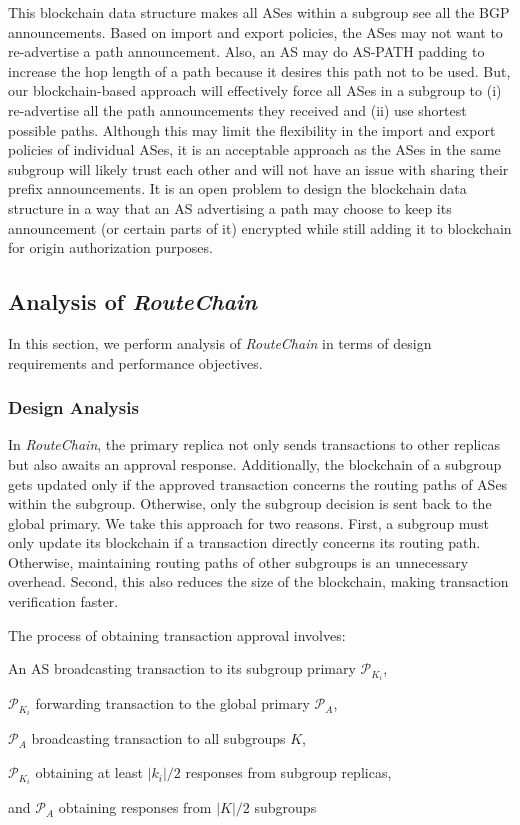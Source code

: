 \documentclass[5p]{elsarticle}
\newcommand{\rc}{{{\em RouteChain}}\xspace}
\begin{document}
This blockchain data structure makes all ASes within a subgroup see all the BGP announcements. Based on import and export policies, the ASes may not want to re-advertise a path announcement. Also, an AS may do AS-PATH padding to increase the hop length of a path because it desires this path not to be used. But, our blockchain-based approach will effectively force all ASes in a subgroup to (i) re-advertise all the path announcements they received and (ii) use shortest possible paths. Although this may limit the flexibility in the import and export policies of individual ASes, it is an acceptable approach as the ASes in the same subgroup will likely trust each other and will not have an issue with sharing their prefix announcements. It is an open problem to design the blockchain data structure in a way that an AS advertising a path may choose to keep its announcement (or certain parts of it) encrypted while still adding it to blockchain for origin authorization purposes.






\subsection{Analysis of {\em RouteChain}} \label{sec:ana}
In this section, we perform analysis of \rc in terms of design requirements and performance objectives. 
\subsubsection{Design Analysis}\label{sec:da}
In \rc, the primary replica not only sends transactions to other replicas but also awaits an approval response. Additionally, the blockchain of a subgroup gets updated only if the approved transaction concerns the routing paths of ASes within the subgroup. Otherwise, only the subgroup decision is sent back to the global primary. We take this approach for two reasons. First, a subgroup must only update its blockchain if a transaction directly concerns its routing path. Otherwise,  maintaining routing paths of other subgroups is an unnecessary overhead. Second, this also reduces the size of the blockchain, making transaction verification faster. 

The process of obtaining transaction approval involves:
\begin{enumerate*}
    \item An AS broadcasting transaction to its subgroup primary $\mathcal{P}_{K_{i}}$,
    \item $\mathcal{P}_{K_{i}}$ forwarding transaction to the global primary $\mathcal{P}_{A}$,
    \item $\mathcal{P}_{A}$ broadcasting transaction to all subgroups $K$, 
    \item $\mathcal{P}_{K_{i}}$ obtaining at least $|k_{i}|/2$ responses from subgroup replicas,
    \item and $\mathcal{P}_{A}$ obtaining responses from $|K|/2$ subgroups
\end{enumerate*}
\end{document}
